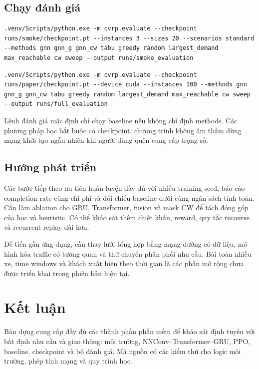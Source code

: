 \documentclass[12pt,a4paper,oneside]{report}
\begin{document}
\section{Chạy đánh giá}
\begin{lstlisting}[language={},caption={Đánh giá thử checkpoint trên kịch bản chuẩn}]
.venv/Scripts/python.exe -m cvrp.evaluate --checkpoint runs/smoke/checkpoint.pt --instances 3 --sizes 20 --scenarios standard --methods gnn gnn_g gnn_cw tabu greedy random largest_demand max_reachable cw sweep --output runs/smoke_evaluation
\end{lstlisting}
\begin{lstlisting}[language={},caption={Đánh giá đủ bảy kịch bản và bốn kích thước}]
.venv/Scripts/python.exe -m cvrp.evaluate --checkpoint runs/paper/checkpoint.pt --device cuda --instances 100 --methods gnn gnn_g gnn_cw tabu greedy random largest_demand max_reachable cw sweep --output runs/full_evaluation
\end{lstlisting}
Lệnh đánh giá mặc định chỉ chạy baseline nếu không chỉ định methods.
Các phương pháp học bắt buộc có checkpoint; chương trình không âm thầm
dùng mạng khởi tạo ngẫu nhiên khi người dùng quên cung cấp trọng số.

\section{Hướng phát triển}
Các bước tiếp theo ưu tiên huấn luyện đầy đủ với nhiều training seed,
báo cáo completion rate cùng chi phí và đối chiếu baseline dưới cùng
ngân sách tính toán. Cần làm ablation cho GRU, Transformer, fusion và
mask CW để tách đóng góp của học và heuristic. Có thể khảo sát thêm
chiết khấu, reward, quy tắc recourse và recurrent replay dài hơn.

Để tiến gần ứng dụng, cần thay lưới tổng hợp bằng mạng đường có dữ liệu,
mô hình hóa traffic có tương quan và thử chuyển phân phối nhu cầu.
Bài toán nhiều xe, time windows và khách xuất hiện theo thời gian là
các phần mở rộng chưa được triển khai trong phiên bản hiện tại.

\chapter*{Kết luận}
Bản dựng cung cấp đầy đủ các thành phần phần mềm để khảo sát định tuyến
với bất định nhu cầu và giao thông: môi trường, NNConv--Transformer--GRU,
PPO, baseline, checkpoint và bộ đánh giá. Mã nguồn có các kiểm thử cho
logic môi trường, phép tính mạng và quy trình học.
\end{document}

